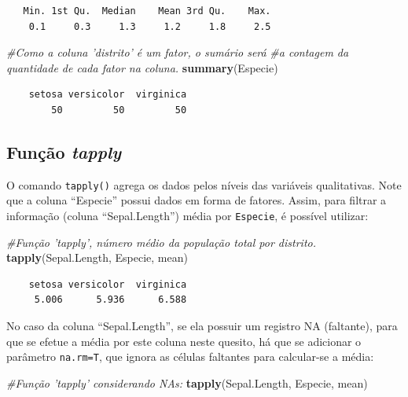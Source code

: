 \documentclass[12pt,brazil,oneside]{book}
\newenvironment{Shaded}{\begin{snugshade}}{\end{snugshade}}
\newcommand{\CommentTok}[1]{\textcolor[rgb]{0.56,0.35,0.01}{\textit{#1}}}
\newcommand{\KeywordTok}[1]{\textcolor[rgb]{0.13,0.29,0.53}{\textbf{#1}}}
\newcommand{\NormalTok}[1]{#1}
\begin{document}
\begin{verbatim}
   Min. 1st Qu.  Median    Mean 3rd Qu.    Max. 
    0.1     0.3     1.3     1.2     1.8     2.5 
\end{verbatim}

\begin{Shaded}
\begin{Highlighting}[]
\CommentTok{#Como a coluna 'distrito' é um fator, o sumário será }
\CommentTok{#a contagem da quantidade de cada fator na coluna.}
\KeywordTok{summary}\NormalTok{(Especie)}
\end{Highlighting}
\end{Shaded}

\begin{verbatim}
    setosa versicolor  virginica 
        50         50         50 
\end{verbatim}

\hypertarget{funcao-tapply}{%
\subsection{\texorpdfstring{Função \emph{tapply}}{Função tapply}}\label{funcao-tapply}}

O comando \texttt{tapply()} agrega os dados pelos níveis das variáveis qualitativas. Note que a coluna ``Especie'' possui dados em forma de fatores. Assim, para filtrar a informação (coluna ``Sepal.Length'') média por \texttt{Especie}, é possível utilizar:

\begin{Shaded}
\begin{Highlighting}[]
\CommentTok{#Função 'tapply', número médio da população total por distrito.}
\KeywordTok{tapply}\NormalTok{(Sepal.Length, Especie, mean)}
\end{Highlighting}
\end{Shaded}

\begin{verbatim}
    setosa versicolor  virginica 
     5.006      5.936      6.588 
\end{verbatim}

No caso da coluna ``Sepal.Length'', se ela possuir um registro NA (faltante), para que se efetue a média por este coluna neste quesito, há que se adicionar o parâmetro \texttt{na.rm=T}, que ignora as células faltantes para calcular-se a média:

\begin{Shaded}
\begin{Highlighting}[]
\CommentTok{#Função 'tapply' considerando NAs:}
\KeywordTok{tapply}\NormalTok{(Sepal.Length, Especie, mean)}
\end{Highlighting}
\end{Shaded}
\end{document}
